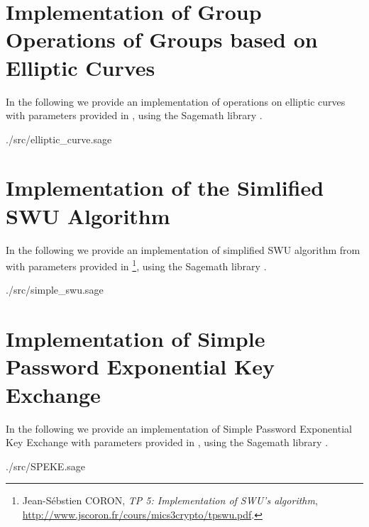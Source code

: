 \appendix
\section{Implementation of Group Operations of Groups based on Elliptic Curves}
\label{appA}
In the following we provide an implementation of operations on elliptic curves
with parameters provided in ,
using the Sagemath library \cite{sage5.12}.

{./src/elliptic_curve.sage}

\section{Implementation of the Simlified SWU Algorithm}
\label{appB}
In the following we provide an implementation of simplified SWU algorithm from
\cite{brier2010efficient} with parameters provided in 
\footnote{\label{tp5}Jean-S\'ebstien CORON,
\emph{TP 5: Implementation of SWU's algorithm},
\url{http://www.jscoron.fr/cours/mics3crypto/tpswu.pdf}.},
using the Sagemath library \cite{sage5.12}.

{./src/simple_swu.sage}

\section{Implementation of Simple Password Exponential Key Exchange}
\label{appC}
In the following we provide an implementation of Simple Password Exponential Key
Exchange
with parameters provided in ,
using the Sagemath library \cite{sage5.12}.

{./src/SPEKE.sage}

